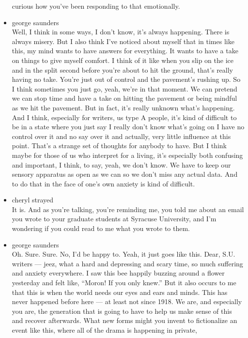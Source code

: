 \begin{itemize}
  curious how you've been responding to that emotionally.
\item
  george saunders\\
  Well, I think in some ways, I don't know, it's always happening. There
  is always misery. But I also think I've noticed about myself that in
  times like this, my mind wants to have answers for everything. It
  wants to have a take on things to give myself comfort. I think of it
  like when you slip on the ice and in the split second before you're
  about to hit the ground, that's really having no take. You're just out
  of control and the pavement's rushing up. So I think sometimes you
  just go, yeah, we're in that moment. We can pretend we can stop time
  and have a take on hitting the pavement or being mindful as we hit the
  pavement. But in fact, it's really unknown what's happening. And I
  think, especially for writers, us type A people, it's kind of
  difficult to be in a state where you just say I really don't know
  what's going on I have no control over it and no say over it and
  actually, very little influence at this point. That's a strange set of
  thoughts for anybody to have. But I think maybe for those of us who
  interpret for a living, it's especially both confusing and important,
  I think, to say, yeah, we don't know. We have to keep our sensory
  apparatus as open as we can so we don't miss any actual data. And to
  do that in the face of one's own anxiety is kind of difficult.
\item
  cheryl strayed\\
  It is. And as you're talking, you're reminding me, you told me about
  an email you wrote to your graduate students at Syracuse University,
  and I'm wondering if you could read to me what you wrote to them.
\item
  george saunders\\
  Oh. Sure. Sure. No, I'd be happy to. Yeah, it just goes like this.
  Dear, S.U. writers --- jeez, what a hard and depressing and scary
  time, so much suffering and anxiety everywhere. I saw this bee happily
  buzzing around a flower yesterday and felt like, ``Moron! If you only
  knew.'' But it also occurs to me that this is when the world needs our
  eyes and ears and minds. This has never happened before here --- at
  least not since 1918. We are, and especially you are, the generation
  that is going to have to help us make sense of this and recover
  afterwards. What new forms might you invent to fictionalize an event
  like this, where all of the drama is happening in private,

\end{itemize}
